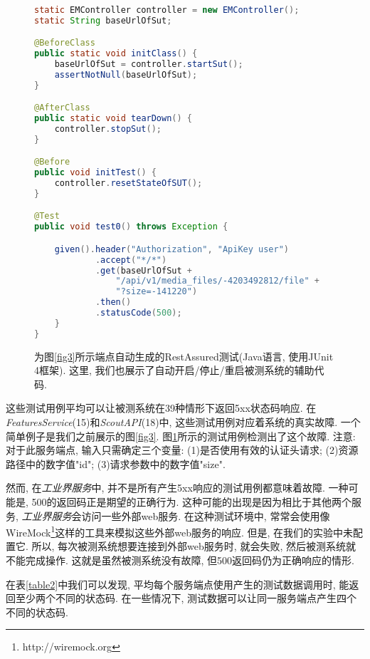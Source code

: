     \begin{figure}
        {
        \tt
        \tiny
      \begin{lstlisting}[language=java]
static EMController controller = new EMController();
static String baseUrlOfSut;

@BeforeClass
public static void initClass() {
    baseUrlOfSut = controller.startSut();
    assertNotNull(baseUrlOfSut);
}

@AfterClass
public static void tearDown() {
    controller.stopSut();
}

@Before
public void initTest() {
    controller.resetStateOfSUT();
}

@Test
public void test0() throws Exception {

    given().header("Authorization", "ApiKey user")
            .accept("*/*")
            .get(baseUrlOfSut + 
                "/api/v1/media_files/-4203492812/file" +
                "?size=-141220")
            .then()
            .statusCode(500);
    }
}
    \end{lstlisting}
        }
        \caption{为图\ref{fig3}所示端点自动生成的RestAssured测试(Java语言, 使用JUnit 4框架). 这里, 我们也展示了自动开启/停止/重启被测系统的辅助代码.}
        \label{fig5}
    \end{figure}
        
        这些测试用例平均可以让被测系统在39种情形下返回5xx状态码响应. 在\textit{FeaturesService}(15)和\textit{ScoutAPI}(18)中, 这些测试用例对应着系统的真实故障. 一个简单例子是我们之前展示的图\ref{fig3}. 图\ref{fig5}所示的测试用例检测出了这个故障. 注意: 对于此服务端点, 输入只需确定三个变量: (1)是否使用有效的认证头请求; (2)资源路径中的数字值"id"; (3)请求参数中的数字值"size". 
        
        然而, 在\textit{工业界服务}中, 并不是所有产生5xx响应的测试用例都意味着故障. 一种可能是, 500的返回码正是期望的正确行为. 这种可能的出现是因为相比于其他两个服务, \textit{工业界服务}会访问一些外部web服务. 在这种测试环境中, 常常会使用像WireMock\footnote{http://wiremock.org}这样的工具来模拟这些外部web服务的响应. 但是, 在我们的实验中未配置它. 所以, 每次被测系统想要连接到外部web服务时, 就会失败, 然后被测系统就不能完成操作. 这就是虽然被测系统没有故障, 但500返回码仍为正确响应的情形. 
        
        在表\ref{table2}中我们可以发现, 平均每个服务端点使用产生的测试数据调用时, 能返回至少两个不同的状态码. 在一些情况下, 测试数据可以让同一服务端点产生四个不同的状态码. 
        
    
